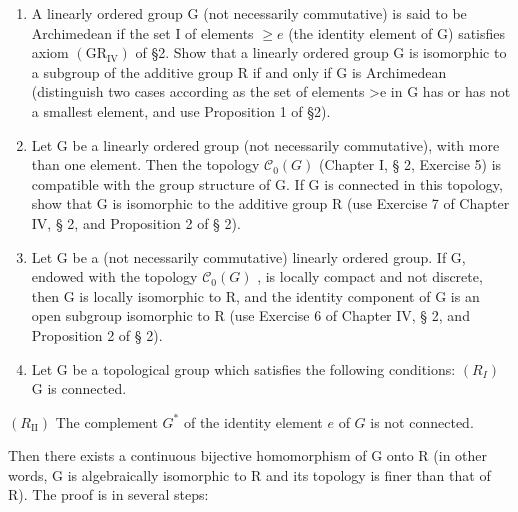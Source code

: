 \begin{enumerate}
\def\labelenumi{\arabic{enumi})}
\item
  A linearly ordered group G (not necessarily commutative) is said to be Archimedean if the set I of elements \(\geqslant e\) (the identity element of G) satisfies axiom \((\mathrm{GR}_{\mathrm{IV}})\) of §2. Show that a linearly ordered group G is isomorphic to a subgroup of the additive group R if and only if G is Archimedean (distinguish two cases according as the set of elements \textgreater e in G has or has not a smallest element, and use Proposition 1 of §2).
\item
  Let G be a linearly ordered group (not necessarily commutative), with more than one element. Then the topology \(\mathcal{C}_{0}(G)\) (Chapter I, § 2, Exercise 5) is compatible with the group structure of G. If G is connected in this topology, show that G is isomorphic to the additive group R (use Exercise 7 of Chapter IV, § 2, and Proposition 2 of § 2).
\item
  Let G be a (not necessarily commutative) linearly ordered group. If G, endowed with the topology \(\mathcal{C}_{0}(G)\) , is locally compact and not discrete, then G is locally isomorphic to R, and the identity component of G is an open subgroup isomorphic to R (use Exercise 6 of Chapter IV, § 2, and Proposition 2 of § 2).
\item
  Let G be a topological group which satisfies the following conditions: \((R_{I})\) G is connected.
\end{enumerate}

\((R_{\mathrm{II}})\) The complement \(G^{*}\) of the identity element \(e\) of \(G\) is not connected.

Then there exists a continuous bijective homomorphism of G onto R (in other words, G is algebraically isomorphic to R and its topology is finer than that of R). The proof is in several steps:

